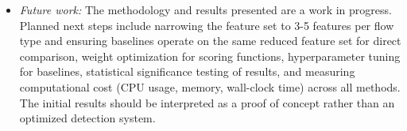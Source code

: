 \begin{itemize}
\item \textit{Future work:} The methodology and results presented are a work in progress. Planned next steps include narrowing the feature set to 3-5 features per flow type and ensuring baselines operate on the same reduced feature set for direct comparison, weight optimization for scoring functions, hyperparameter tuning for baselines, statistical significance testing of results, and measuring computational cost (CPU usage, memory, wall-clock time) across all methods. The initial results should be interpreted as a proof of concept rather than an optimized detection system.
\end{itemize}
